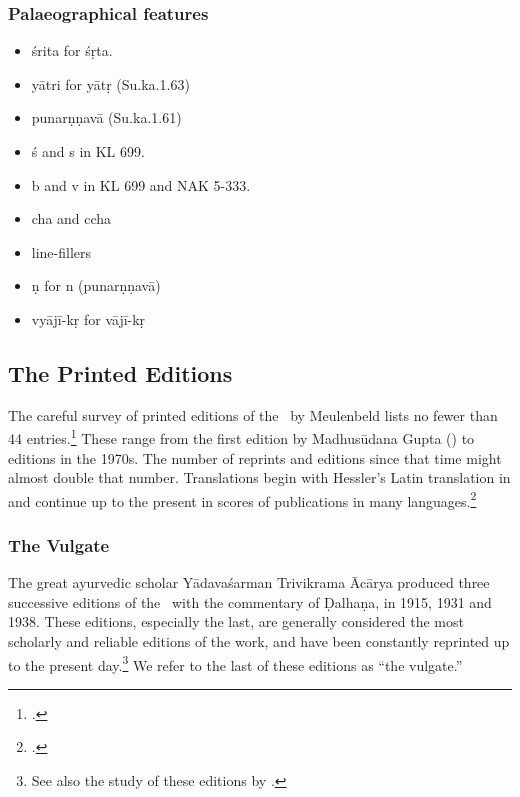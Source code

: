 \subsubsection{Palaeographical features}
\begin{itemize}
    \item śrita for śṛta.
    \item yātri for yātṛ (Su.ka.1.63) %
     \item punarṇṇavā  (Su.ka.1.61) %
    \item ś and s in KL 699.
    \item b and v in KL 699 and NAK 5-333.
    \item cha and ccha
    \item line-fillers
    \item \d n for n (punar\d n\d nav\=a)
    \item vyājī-kṛ for vājī-kṛ
\end{itemize}


\subsection{The Printed Editions}

The careful survey of printed editions of the \SS\ by Meulenbeld lists no fewer than 
44 entries.\footcite[IIB, 311--314]{meul-hist}  These range from the first edition 
by 
Madhusūdana Gupta (\citeyear{gupt-1835}) to editions in the 1970s. The 
number of 
reprints and editions since that time might almost double that number.  
Translations begin with Hessler's Latin translation in \citeyear{hess-1855} and 
continue up to the present in scores of publications in many 
languages.\footcites[E.g.,]{zysk-1984}[IIB, 314--315]{meul-hist}

\subsubsection{The Vulgate}


The great ayurvedic scholar Yādavaśarman Trivikrama Ācārya produced three 
successive editions of the
\SS\ with the commentary of Ḍalhaṇa, in 1915, 1931 and 1938.  These
editions, especially the last, are generally considered the most 
scholarly
and reliable editions of the work, and have been constantly reprinted up
to the present day.\footnote{See also the study of these editions by \textcites[\S 
1.2]{kleb-2021b}[143--144]{wuja-2013}.}  We refer to the last of these editions 
as “the vulgate.”

